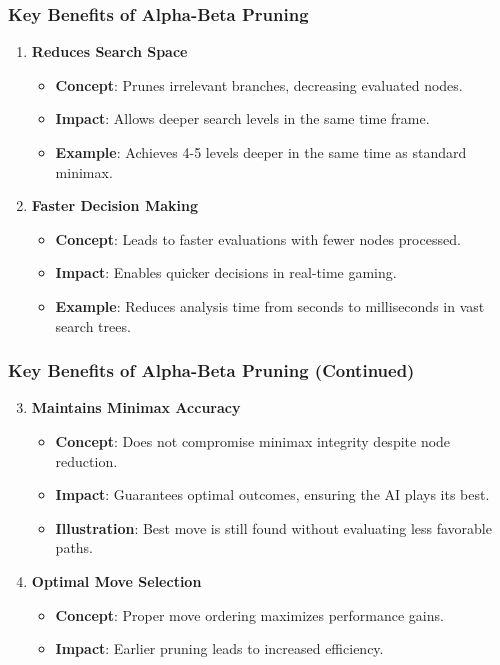 \documentclass[aspectratio=169]{beamer}
\begin{document}
\begin{frame}
    \frametitle{Key Benefits of Alpha-Beta Pruning}
    \begin{enumerate}
        \item \textbf{Reduces Search Space}
        \begin{itemize}
            \item \textbf{Concept}: Prunes irrelevant branches, decreasing evaluated nodes.
            \item \textbf{Impact}: Allows deeper search levels in the same time frame.
            \item \textbf{Example}: Achieves 4-5 levels deeper in the same time as standard minimax.
        \end{itemize}

        \item \textbf{Faster Decision Making}
        \begin{itemize}
            \item \textbf{Concept}: Leads to faster evaluations with fewer nodes processed.
            \item \textbf{Impact}: Enables quicker decisions in real-time gaming.
            \item \textbf{Example}: Reduces analysis time from seconds to milliseconds in vast search trees.
        \end{itemize}
    \end{enumerate}
\end{frame}

\begin{frame}
    \frametitle{Key Benefits of Alpha-Beta Pruning (Continued)}
    \begin{enumerate}
        \setcounter{enumi}{2}
        \item \textbf{Maintains Minimax Accuracy}
        \begin{itemize}
            \item \textbf{Concept}: Does not compromise minimax integrity despite node reduction.
            \item \textbf{Impact}: Guarantees optimal outcomes, ensuring the AI plays its best.
            \item \textbf{Illustration}: Best move is still found without evaluating less favorable paths.
        \end{itemize}

        \item \textbf{Optimal Move Selection}
        \begin{itemize}
            \item \textbf{Concept}: Proper move ordering maximizes performance gains.
            \item \textbf{Impact}: Earlier pruning leads to increased efficiency.
        \end{itemize}
    \end{enumerate}
\end{frame}
\end{document}
